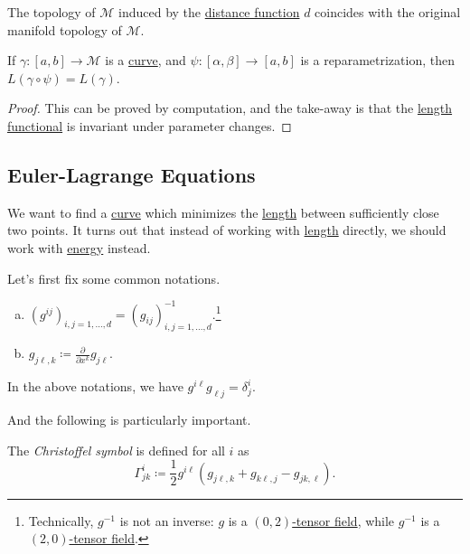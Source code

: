 \begin{corollary}
	The topology of \(\mathcal{M} \) induced by the \hyperref[def:distance]{distance function} \(d\) coincides with the original manifold topology of \(\mathcal{M} \).
\end{corollary}

\begin{lemma}
	If \(\gamma\colon [a, b] \to \mathcal{M} \) is a \hyperref[def:curve]{curve}, and \(\psi \colon [\alpha , \beta ] \to [a, b]\) is a reparametrization, then \(L(\gamma \circ \psi ) = L(\gamma )\).
\end{lemma}
\begin{proof}
	This can be proved by computation, and the take-away is that the \hyperref[def:length]{length functional} is invariant under parameter changes.
\end{proof}

\subsection{Euler-Lagrange Equations}
We want to find a \hyperref[def:curve]{curve} which minimizes the \hyperref[def:length]{length} between sufficiently close two points. It turns out that instead of working with \hyperref[def:length]{length} directly, we should work with \hyperref[def:energy]{energy} instead.

\begin{notation}
	Let's first fix some common notations.

	\begin{enumerate}[(a)]
		\item \(\left( g^{ij} \right) _{i, j=1, \ldots , d} = \left( g_{ij} \right)_{i, j = 1, \ldots , d} ^{-1} \).\footnote{Technically, \(g^{-1} \) is not an inverse: \(g\) is a \hyperref[def:tensor-field]{\((0, 2)\)-tensor field}, while \(g^{-1} \) is a \hyperref[def:tensor-field]{\((2, 0)\)-tensor field}.}
		\item \(g_{j \ell , k} \coloneqq \frac{\partial }{\partial x^k} g_{j \ell }\).
	\end{enumerate}
\end{notation}

\begin{note}
	In the above notations, we have \(g^{i \ell} g_{\ell j}=\delta ^i_j \).
\end{note}

And the following is particularly important.

\begin{notation}\label{not:Christoffel-symbol}
	The \emph{Christoffel symbol} is defined for all \(i\) as
	\[
		\Gamma ^i_{jk} \coloneqq \frac{1}{2}g^{i \ell }\left( g_{j \ell , k} + g_{k \ell , j} - g_{jk, \ell }\right).
	\]
\end{notation}

